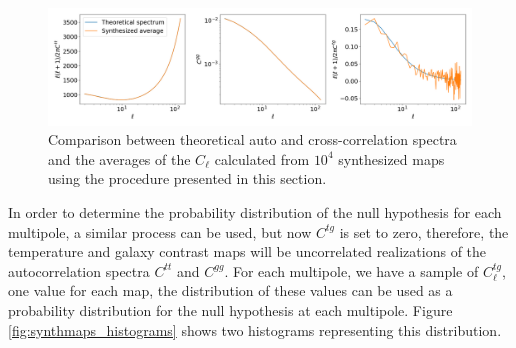 \documentclass[openany,a4paper,12pt,oneside]{book}
\begin{document}
\begin{spacing}{1.5}
\begin{figure}[!htb]
\centering
\includegraphics[width=\linewidth]{Imagens/Synth_TriplePlot.png}
\caption{Comparison between theoretical auto and cross-correlation spectra and the averages of the $C_\ell$ calculated from $10^4$ synthesized maps using the procedure presented in this section.}
\label{fig:SynthMaps_AvPlots}
\end{figure}

In order to determine the probability distribution of the null hypothesis for each multipole, a similar process can be used, but now $C^{tg}$ is set to zero, therefore, the temperature and galaxy contrast maps will be uncorrelated realizations of the autocorrelation spectra $C^{tt}$ and $C^{gg}$. For each multipole, we have a sample of $C^{tg}_\ell$, one value for each map, the distribution of these values can be used as a probability distribution for the null hypothesis at each multipole. Figure \ref{fig:synthmaps_histograms} shows two histograms representing this distribution.


\end{spacing}
\end{document}
